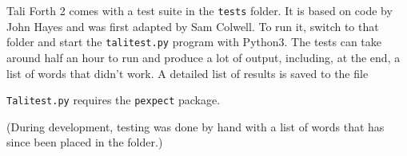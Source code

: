
Tali Forth 2 comes with a test suite in the \texttt{tests}
folder. It is based on code by John Hayes and was first
adapted by Sam Colwell. To run it, switch to that folder and
start the \texttt{talitest.py} program
with Python3. The tests can take around half an hour to run and produce a lot of
output, including, at the end, a list of words that didn't work. A detailed list
of results is saved to the file  

\texttt{Talitest.py} requires the
\texttt{pexpect} package.

(During development, testing was done by hand with a list of words that has
since been placed in the  folder.)

